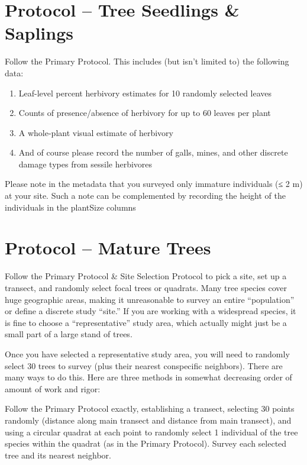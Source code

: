 \documentclass[
  letterpaper,
  DIV=11,
  numbers=noendperiod]{scrreprt}
\providecommand{\tightlist}{%
  \setlength{\itemsep}{0pt}\setlength{\parskip}{0pt}}\usepackage{longtable,booktabs,array}
\begin{document}
\section{Protocol -- Tree Seedlings \&
Saplings}\label{protocol-tree-seedlings-saplings}

Follow the Primary Protocol. This includes (but isn't limited to) the
following data:

\begin{enumerate}
\def\labelenumi{\arabic{enumi}.}
\tightlist
\item
  Leaf-level percent herbivory estimates for 10 randomly selected leaves
\item
  Counts of presence/absence of herbivory for up to 60 leaves per plant
\item
  A whole-plant visual estimate of herbivory
\item
  And of course please record the number of galls, mines, and other
  discrete damage types from sessile herbivores
\end{enumerate}

Please note in the metadata that you surveyed only immature individuals
(≤ 2 m) at your site. Such a note can be complemented by recording the
height of the individuals in the plantSize columns

\section{Protocol -- Mature Trees}\label{protocol-mature-trees}

Follow the Primary Protocol \& Site Selection Protocol to pick a site,
set up a transect, and randomly select focal trees or quadrats. Many
tree species cover huge geographic areas, making it unreasonable to
survey an entire ``population'' or define a discrete study ``site.'' If
you are working with a widespread species, it is fine to choose a
``representative'' study area, which actually might just be a small part
of a large stand of trees.

Once you have selected a representative study area, you will need to
randomly select 30 trees to survey (plus their nearest conspecific
neighbors). There are many ways to do this. Here are three methods in
somewhat decreasing order of amount of work and rigor:

Follow the Primary Protocol exactly, establishing a transect, selecting
30 points randomly (distance along main transect and distance from main
transect), and using a circular quadrat at each point to randomly select
1 individual of the tree species within the quadrat (as in the Primary
Protocol). Survey each selected tree and its nearest neighbor.
\end{document}

